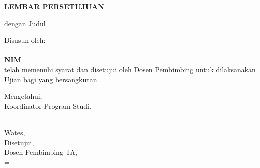 
\newpage

\newcommand{\smartsignature}[2]{%
    \setbox0=\hbox{#1}%
    \ifdim\wd0>0.47\textwidth
        {\small #1\\[0.3em]#2}%
    \else
        {#1\\[0.3em]#2}%
    \fi
}

\begin{center}
    \begin{doublespace}
        \textbf{\large \MakeUppercase{lembar persetujuan}}
    \end{doublespace}
\end{center}

\begin{center}
    {\tipe} dengan Judul
\end{center}

\begin{center}
    \begin{doublespace}
        \textbf{\large \MakeUppercase {\judulid}}
    \end{doublespace}
\end{center}

\begin{center}
    Disusun oleh:\\
    \textbf{\penulis}\\
    \textbf{NIM \nim}\\[1.5cm]

    telah memenuhi syarat dan disetujui oleh Dosen Pembimbing untuk dilaksanakan Ujian {\tipe} bagi yang bersangkutan.\\[0.75cm]
\end{center}

\vspace{0.75cm}
\noindent\begin{minipage}[t]{0.47\textwidth}
    \centering
    \vspace{1.5em}
    Mengetahui,\\
    Koordinator Program Studi,\\[2.5cm]
    
    \smartsignature{\koorprodi}{NIP. \NIPkoorprodi}
\end{minipage}%
\hfill%
\begin{minipage}[t]{0.47\textwidth}
    \centering
    Wates, \tglpersetujuan\\[1em]
    Disetujui,\\
    Dosen Pembimbing TA,\\[2.5cm]
    
    \smartsignature{\pembimbingsatu}{NIP. \NIPpembimbingsatu}
\end{minipage}%
